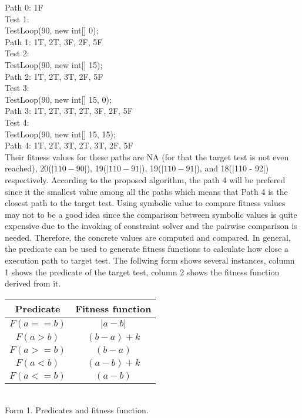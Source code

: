 \hspace*{0.3in}Path 0: 1F\\
Test 1:\\
\hspace*{0.1in}TestLoop(90, new int[] {0});\\
\hspace*{0.3in}Path 1: 1T, 2T, 3F, 2F, 5F\\
Test 2:\\
\hspace*{0.1in}TestLoop(90, new int[] {15});\\
\hspace*{0.3in}Path 2: 1T, 2T, 3T, 2F, 5F\\
Test 3:\\
\hspace*{0.1in}TestLoop(90, new int[] {15, 0});\\
\hspace*{0.3in}Path 3: 1T, 2T, 3T, 2T, 3F, 2F, 5F\\
Test 4:\\
\hspace*{0.1in}TestLoop(90, new int[] {15, 15});\\
\hspace*{0.3in}Path 4: 1T, 2T, 3T, 2T, 3T, 2F, 5F\\
Their fitness values for these paths are NA (for that the target test is not even reached), 20($|110 - 90|$), 19($|110 - 91|$), 19($|110 - 91|$), and 18(|110 - 92|) respectively. According to the proposed algorithm, the path 4 will be prefered since it the smallest value among all the paths which means that Path 4 is the closest path to the target test. Using symbolic value to compare fitness values may not to be a good idea since the comparison between symbolic values is quite expensive due to the invoking of constraint solver and the pairwise comparison is needed. Therefore, the concrete values are computed and compared. In general,  the predicate can be used to generate fitness functions to calculate how close a execution path to target test. The follwing form shows several instances, column 1 shows the predicate of the target test, column 2 shows the fitness function derived from it.\\
\begin{center}
\begin{tabular}{|c|c|}\hline
Predicate & Fitness function \\\hline
$F(a==b)$ & $|a-b|$ \\\hline
$F(a>b)$ & $(b-a)+k$ \\\hline
$F(a>=b)$ & $(b-a)$ \\\hline
$F(a<b)$ & $(a-b)+k$ \\\hline
$F(a<=b)$ & $(a-b)$ \\\hline
\end{tabular}\\
Form 1. Predicates and fitness function.
\end{center}
